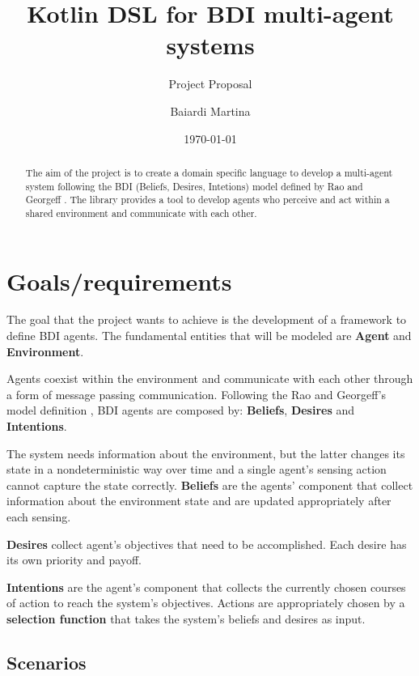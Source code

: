 \documentclass{scrartcl}
\title{\LARGE
    Kotlin DSL for BDI multi-agent systems
}
\subtitle{Project Proposal}
\author{
    Baiardi Martina \\ \emailaddr{martina.baiardi4@studio.unibo.it}
}
\date{\today}
\begin{document}
\maketitle

\begin{abstract}
    The aim of the project is to create a domain specific language to develop a multi-agent system following the BDI (Beliefs, Desires, Intetions) model defined by Rao and Georgeff \cite{rao1995bdi}.
    The library provides a tool to develop agents who perceive and act within a shared environment and communicate with each other.
\end{abstract}

\section{Goals/requirements}

The goal that the project wants to achieve is the development of a framework to define BDI agents.
The fundamental entities that will be modeled are \textbf{Agent} and \textbf{Environment}.

\smallskip

Agents coexist within the environment and communicate with each other through a form of message passing communication.
Following the Rao and Georgeff's model definition \cite{rao1995bdi}, BDI agents are composed by: \textbf{Beliefs}, \textbf{Desires} and \textbf{Intentions}.

\bigskip

The system needs information about the environment, but the latter changes its state in a nondeterministic way over time
and a single agent's sensing action cannot capture the state correctly.
\textbf{Beliefs} are the agents' component that collect information about the environment state and are updated appropriately after each sensing.

\bigskip

\textbf{Desires} collect agent's objectives that need to be accomplished.
Each desire has its own priority and payoff.

\bigskip

\textbf{Intentions} are the agent's component that collects the currently chosen courses of action to reach the system's objectives.
Actions are appropriately chosen by a \textbf{selection function} that takes the system's beliefs and desires as input.


\subsection{Scenarios}
\end{document}
